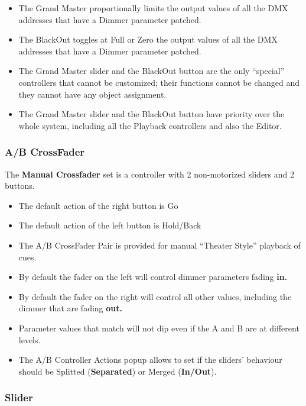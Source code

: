 \documentclass[
]{article}
\begin{document}
\begin{itemize}
\item
  The Grand Master proportionally limits the output values of all the DMX addresses that have a Dimmer parameter patched.
\item
  The BlackOut toggles at Full or Zero the output values of all the DMX addresses that have a Dimmer parameter patched.
\item
  The Grand Master slider and the BlackOut button are the only ``special'' controllers that cannot be customized; their functions cannot be changed and they cannot have any object assignment.
\item
  The Grand Master slider and the BlackOut button have priority over the whole system, including all the Playback controllers and also the Editor.
\end{itemize}

\hypertarget{ab-crossfader}{%
\subsubsection{A/B CrossFader}\label{ab-crossfader}}

The \textbf{Manual Crossfader} set is a controller with 2 non-motorized sliders and 2 buttons.

\begin{itemize}
\item
  The default action of the right button is Go
\item
  The default action of the left button is Hold/Back
\item
  The A/B CrossFader Pair is provided for manual ``Theater Style'' playback of cues.
\item
  By default the fader on the left will control dimmer parameters fading \textbf{in.}
\item
  By default the fader on the right will control all other values, including the dimmer that are fading \textbf{out.}
\item
  Parameter values that match will not dip even if the A and B are at different levels.
\item
  The A/B Controller Actions popup allows to set if the sliders' behaviour should be Splitted (\textbf{Separated}) or Merged (\textbf{In/Out}).
\end{itemize}

\hypertarget{slider}{%
\subsubsection{Slider}\label{slider}}
\end{document}
